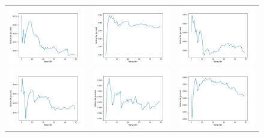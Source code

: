 \begin{figure}[h!]
\begin{tabular}{ccc}
        \includegraphics[width=4.5cm]{../Plots/score_epoch_6.png} &
        \includegraphics[width=4.5cm]{../Plots/score_epoch_7.png} &
        \includegraphics[width=4.5cm]{../Plots/score_epoch_8.png} \\

        \includegraphics[width=4.5cm]{../Plots/score_epoch_9.png} &
        \includegraphics[width=4.5cm]{../Plots/score_epoch_10.png} &
        \includegraphics[width=4.5cm]{../Plots/score_epoch_11.png} \\


\end{tabular}
\end{figure}
